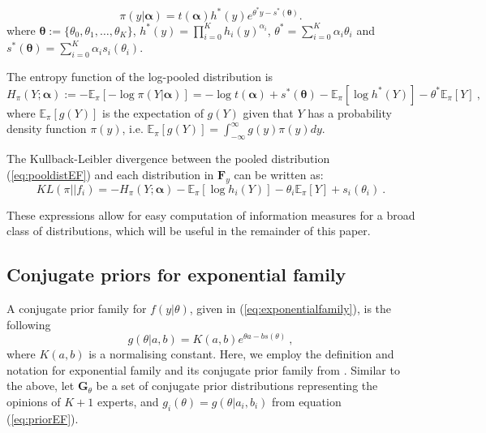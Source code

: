 \documentclass[a4paper, notitlepage, 10pt]{article}
\begin{document}
\begin{equation}
\label{eq:pooldistEF}
\pi(y| \boldsymbol\alpha ) = t(\boldsymbol\alpha) h^\ast (y) e^{\theta^\ast y - s^\ast (\boldsymbol\theta)}.
\end{equation}
where $\boldsymbol\theta :=\{\theta_0, \theta_1, \ldots, \theta_K \}$, $h^\ast (y) = \prod_{i = 0}^K h_i(y)^{\alpha_i}$,  $\theta^\ast = \sum_{i = 0}^K \alpha_i \theta_i$ and $s^\ast (\boldsymbol\theta) = \sum_{i = 0}^K \alpha_i s_i(\theta_i)$.

The entropy function of the log-pooled distribution is
\begin{equation}
\label{eq:entropydistEF}
H_\pi(Y; \boldsymbol\alpha) :=  - \mathbb{E}_{\pi}\left[-\log \pi(Y | \boldsymbol\alpha) \right] = -\log t(\boldsymbol\alpha) + s^\ast (\boldsymbol\theta) - \mathbb{E}_\pi[\log h^\ast (Y)] - \theta^\ast \mathbb{E}_\pi[Y] \: ,
\end{equation}
where $\mathbb{E}_{\pi}\left[ g(Y) \right]$ is the expectation of $g(Y)$ given that $Y$ has a probability density function $\pi(y)$, i.e. $\mathbb{E}_{\pi}\left[ g(Y) \right] = \int_{-\infty}^{\infty} g(y) \pi(y) dy$. 

The Kullback-Leibler divergence between the pooled distribution (\ref{eq:pooldistEF}) and each distribution in $\mathbf{F}_{y}$ can be written as:
\begin{equation}
\label{eq:KLdistEF}
KL(\pi || f_i )  =  - H_\pi(Y; \boldsymbol\alpha) - \mathbb{E}_\pi[\log h_i(Y)] - \theta_i \mathbb{E}_\pi[Y] + s_i(\theta_i) \: .
\end{equation}

These expressions allow for easy computation of information measures for a broad class of distributions, which will be useful in the remainder of this paper.

\subsection{Conjugate priors for exponential family}
\label{sec:conjugexpofamily}

A conjugate prior family for $f(y|\theta)$, given in (\ref{eq:exponentialfamily}), is the following
\begin{equation}
\label{eq:priorEF}
g(\theta | a, b) = K(a,b) e^{\theta a - b s(\theta)} \: ,
\end{equation}
where $K(a,b)$ is a normalising constant.
Here, we employ the definition and notation for exponential family and its conjugate prior family from \citet[chapter 3]{robert2001}. %
Similar to the above, let $\mathbf{G}_{\theta}$ be a set of conjugate prior distributions representing the opinions of $K+1$ experts, and $g_i(\theta) = g(\theta | a_i, b_i)$ from equation (\ref{eq:priorEF}).
\end{document}
